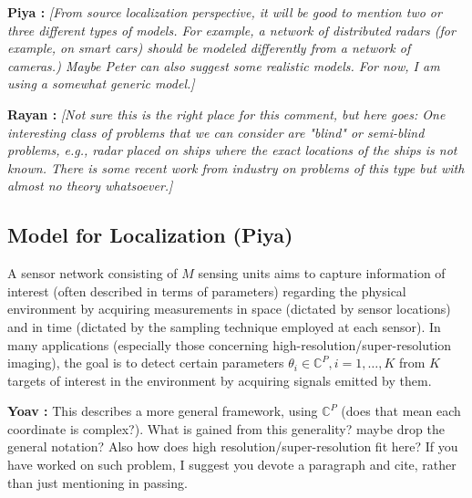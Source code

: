 \documentclass{article}
\newcommand{\comment}[3]{{\color{#1} {\bf #2 :} #3}}
\newcommand{\yoav}[1]{\comment{magenta}{Yoav}{#1}}
\newcommand{\piya}[1]{\comment{blue}{Piya}{#1}}
\newcommand{\rayan}[1]{\comment{red}{Rayan}{#1}}
\begin{document}
\piya{\em [From source localization perspective, it will be good to mention two or three different types of models. For example, a network of distributed radars (for example, on smart cars) should be modeled differently from a network of cameras.) Maybe Peter can also suggest some realistic models. For now, I am using a somewhat generic model.]}

\rayan{\em [Not sure this is the right place for this comment, but here goes: One interesting class of problems that we can consider are "blind" or semi-blind problems, e.g., radar placed on ships where the exact locations of the ships is not known. There is some recent work from industry on problems of this type but with almost no theory whatsoever.]}

\subsection{Model for Localization (Piya)} A sensor network consisting of $M$ sensing units aims to capture information of interest (often described in terms of parameters) regarding the physical environment by acquiring measurements in space (dictated by sensor locations) and in time (dictated by the sampling technique employed at each sensor). In many applications (especially those concerning high-resolution/super-resolution imaging), the goal is to detect certain parameters $\theta_i\in\mathbb{C}^P, i=1,\ldots,K$ from $K$ targets of interest in the environment by acquiring signals emitted by them. 

\yoav{This describes a more general framework, using $\mathbb{C}^P$ (does that mean each coordinate is complex?). What is gained from this generality? maybe drop the general notation? Also how does high resolution/super-resolution fit here? If you have worked on such problem, I suggest you devote a paragraph and cite, rather than just mentioning in passing.} 
\end{document}
